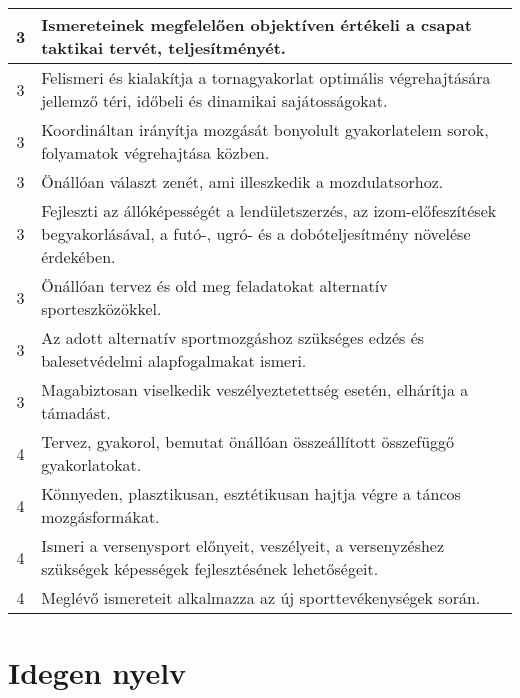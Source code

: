 \begin{longtable}{c | p{12cm} }
                                
                                          3 &  Ismereteinek megfelelően objektíven értékeli a csapat taktikai tervét, teljesítményét. \\ \hline
                                          3 &  Felismeri és kialakítja a tornagyakorlat optimális végrehajtására jellemző téri, időbeli és dinamikai sajátosságokat. \\ \hline
                                          3 &  Koordináltan irányítja mozgását bonyolult gyakorlatelem sorok, folyamatok végrehajtása közben. \\ \hline
                                          3 &  Önállóan választ zenét, ami illeszkedik a mozdulatsorhoz. \\ \hline
                                          3 &  Fejleszti az állóképességét a lendületszerzés, az izom-előfeszítések begyakorlásával, a futó-, ugró- és a dobóteljesítmény növelése érdekében. \\ \hline
                                          3 &  Önállóan tervez  és old meg feladatokat alternatív sporteszközökkel. \\ \hline
                                          3 &  Az adott alternatív sportmozgáshoz szükséges edzés és balesetvédelmi alapfogalmakat ismeri. \\ \hline
                                          3 &  Magabiztosan viselkedik veszélyeztetettség esetén, elhárítja a támadást. \\ \hline
                                      
                                
                                          4 &  Tervez, gyakorol, bemutat önállóan összeállított összefüggő gyakorlatokat. \\ \hline
                                          4 &  Könnyeden, plasztikusan, esztétikusan hajtja végre a táncos mozgásformákat. \\ \hline
                                          4 &  Ismeri a versenysport előnyeit, veszélyeit, a versenyzéshez szükségek képességek fejlesztésének lehetőségeit. \\ \hline
                                          4 &  Meglévő ismereteit alkalmazza az új sporttevékenységek során. \\ \hline
                                      
                        \end{longtable}
            \clearpage

        \section{Idegen nyelv}

